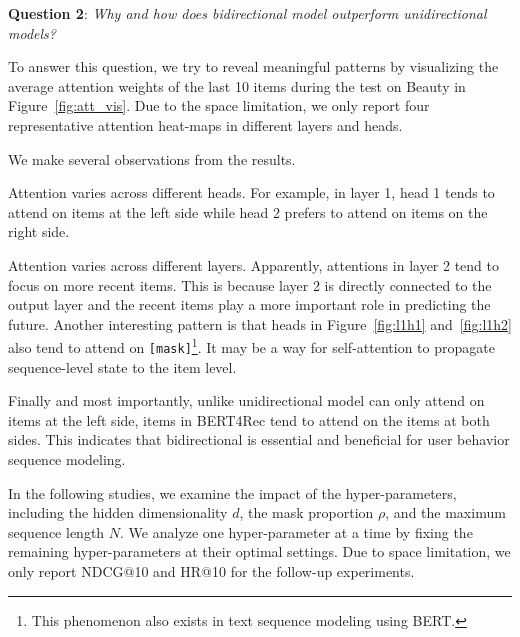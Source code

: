  \textbf{Question 2}: \textit{Why and how does bidirectional model outperform unidirectional models?}

To answer this question, we try to reveal meaningful patterns by visualizing the average attention weights of the last 10 items during the test on Beauty in Figure~\ref{fig:att_vis}. 
Due to the space limitation, we only report four representative attention heat-maps in different layers and heads.


We make several observations from the results.
\begin {enumerate*}[label=\bfseries\itshape\alph*\upshape)]
\item Attention varies across different heads. For example, in layer 1, head 1 tends to attend on items at the left side while head 2 prefers to attend on items on the right side.
\item Attention varies across different layers. Apparently, attentions in layer 2 tend to focus on more recent items. This is because layer 2 is directly connected to the output layer and the recent items play a more important role in predicting the future. Another interesting pattern is that heads in Figure~\ref{fig:l1h1} and~\ref{fig:l1h2} also tend to attend on \texttt{[mask]}\footnote{This phenomenon also exists in text sequence modeling using BERT.}. It may be a way for self-attention to propagate sequence-level state to the item level.
\item Finally and most importantly, unlike unidirectional model can only attend on items at the left side, items in BERT4Rec tend to attend on the items at both sides. This indicates that bidirectional is essential and beneficial for user behavior sequence modeling.
\end {enumerate*}

In the following studies, we examine the impact of the hyper-parameters, including the hidden dimensionality $d$, the mask proportion $\rho$, and the maximum sequence length $N$. We analyze one hyper-parameter at a time by fixing the remaining hyper-parameters at their optimal settings. Due to space limitation, we only report NDCG@10 and HR@10 for the follow-up experiments. 

